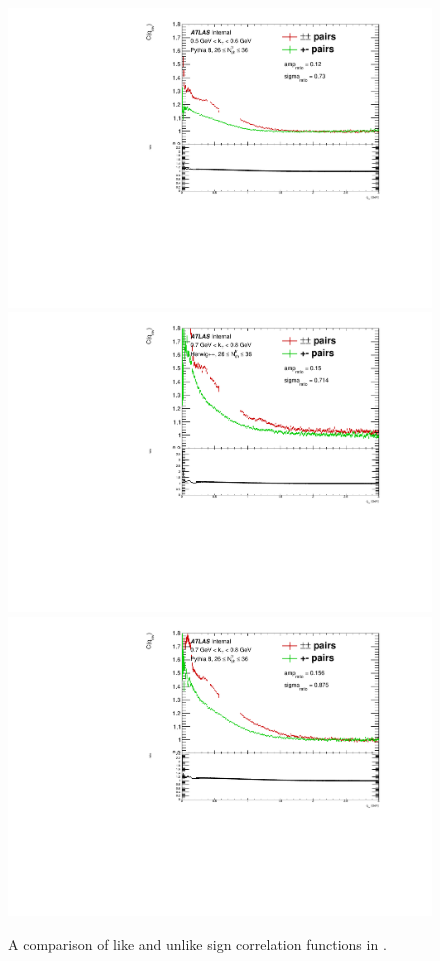 \begin{figure}[t]
\begin{minipage}[t]{1.0\textwidth}
\includegraphics[width=.49\linewidth]{pythia8_bkgd_charge_comp_cent7_kt4.pdf}\\
\includegraphics[width=.49\linewidth]{herwig_bkgd_charge_comp_cent7_kt6.pdf}
\includegraphics[width=.49\linewidth]{pythia8_bkgd_charge_comp_cent7_kt6.pdf}\\
\end{minipage}
\caption{A comparison of like and unlike sign correlation functions in .}
\label{fig:herwig_pythia8_cent7_bkgd_charge_comp}
\end{figure}

